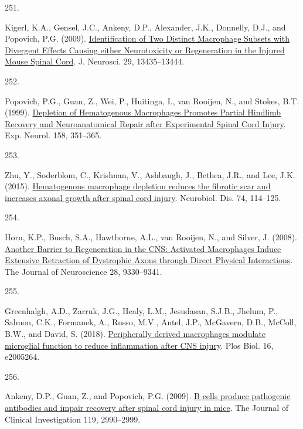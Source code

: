 \documentclass[
]{article}
\newlength{\cslhangindent}
\newlength{\csllabelwidth}
\newlength{\cslentryspacingunit} %
\newenvironment{CSLReferences}[2] %
 {%
  \setlength{\parindent}{0pt}
  \ifodd #1
  \let\oldpar\par
  \def\par{\hangindent=\cslhangindent\oldpar}
  \fi
  \setlength{\parskip}{#2\cslentryspacingunit}
 }%
 {}
\newcommand{\CSLLeftMargin}[1]{\parbox[t]{\csllabelwidth}{#1}}
\newcommand{\CSLRightInline}[1]{\parbox[t]{\linewidth - \csllabelwidth}{#1}\break}
\begin{document}
\begin{CSLReferences}{0}{0}
\leavevmode{}%
\CSLLeftMargin{251. }
\CSLRightInline{Kigerl, K.A., Gensel, J.C., Ankeny, D.P., Alexander, J.K., Donnelly, D.J., and Popovich, P.G. (2009). \href{https://doi.org/10.1523/JNEUROSCI.3257-09.2009}{Identification of {Two Distinct Macrophage Subsets} with {Divergent Effects Causing} either {Neurotoxicity} or {Regeneration} in the {Injured Mouse Spinal Cord}}. J. Neurosci. 29, 13435--13444.}

\leavevmode{}%
\CSLLeftMargin{252. }
\CSLRightInline{Popovich, P.G., Guan, Z., Wei, P., Huitinga, I., van Rooijen, N., and Stokes, B.T. (1999). \href{https://doi.org/10.1006/exnr.1999.7118}{Depletion of {Hematogenous Macrophages Promotes Partial Hindlimb Recovery} and {Neuroanatomical Repair} after {Experimental Spinal Cord Injury}}. Exp. Neurol. 158, 351--365.}

\leavevmode{}%
\CSLLeftMargin{253. }
\CSLRightInline{Zhu, Y., Soderblom, C., Krishnan, V., Ashbaugh, J., Bethea, J.R., and Lee, J.K. (2015). \href{https://doi.org/10.1016/j.nbd.2014.10.024}{Hematogenous macrophage depletion reduces the fibrotic scar and increases axonal growth after spinal cord injury}. Neurobiol. Dis. 74, 114--125.}

\leavevmode{}%
\CSLLeftMargin{254. }
\CSLRightInline{Horn, K.P., Busch, S.A., Hawthorne, A.L., van Rooijen, N., and Silver, J. (2008). \href{https://doi.org/10.1523/JNEUROSCI.2488-08.2008}{Another {Barrier} to {Regeneration} in the {CNS}: {Activated Macrophages Induce Extensive Retraction} of {Dystrophic Axons} through {Direct Physical Interactions}}. The Journal of Neuroscience 28, 9330--9341.}

\leavevmode{}%
\CSLLeftMargin{255. }
\CSLRightInline{Greenhalgh, A.D., Zarruk, J.G., Healy, L.M., Jesudasan, S.J.B., Jhelum, P., Salmon, C.K., Formanek, A., Russo, M.V., Antel, J.P., McGavern, D.B., McColl, B.W., and David, S. (2018). \href{https://doi.org/10.1371/journal.pbio.2005264}{Peripherally derived macrophages modulate microglial function to reduce inflammation after {CNS} injury}. Plos Biol. 16, e2005264.}

\leavevmode{}%
\CSLLeftMargin{256. }
\CSLRightInline{Ankeny, D.P., Guan, Z., and Popovich, P.G. (2009). \href{https://doi.org/10.1172/JCI39780}{B cells produce pathogenic antibodies and impair recovery after spinal cord injury in mice}. The Journal of Clinical Investigation 119, 2990--2999.}


\end{CSLReferences}
\end{document}
